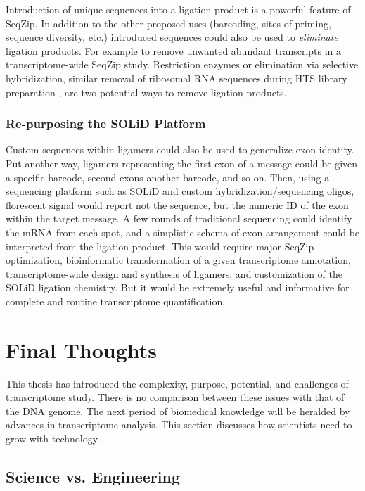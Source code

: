       Introduction of unique sequences into a ligation product is a powerful feature of SeqZip. In addition to the other proposed uses (barcoding, sites of priming, sequence diversity, etc.) introduced sequences could also be used to \textit{eliminate} ligation products. For example to remove unwanted abundant transcripts in a transcriptome-wide SeqZip study. Restriction enzymes or elimination via selective hybridization, similar removal of ribosomal RNA sequences during HTS library preparation \citep{Chen2011a}, are two potential ways to remove ligation products.

    \subsubsection{Re-purposing the SOLiD Platform}
      \label{Disc:subsubsec:SOLiD Platform for SeqZip}

      Custom sequences within ligamers could also be used to generalize exon identity. Put another way, ligamers representing the first exon of a message could be given a specific barcode, second exons another barcode, and so on. Then, using a sequencing platform such as SOLiD and custom hybridization/sequencing oligos, florescent signal would report not the sequence, but the numeric ID of the exon within the target message. A few rounds of traditional sequencing could identify the mRNA from each spot, and a simplistic schema of exon arrangement could be interpreted from the ligation product. This would require major SeqZip optimization, bioinformatic transformation of a given transcriptome annotation, transcriptome-wide design and synthesis of ligamers, and customization of the SOLiD ligation chemistry. But it would be extremely useful and informative for complete and routine transcriptome quantification.

\section{Final Thoughts}
  \label{Disc:sec:Final Thoughts}

  This thesis has introduced the complexity, purpose, potential, and challenges of transcriptome study. There is no comparison between these issues with that of the DNA genome. The next period of biomedical knowledge will be heralded by advances in transcriptome analysis. This section discusses how scientists need to grow with technology.

  \subsection{Science vs. Engineering}
    \label{Disc:subsec:Science and Engineering}

